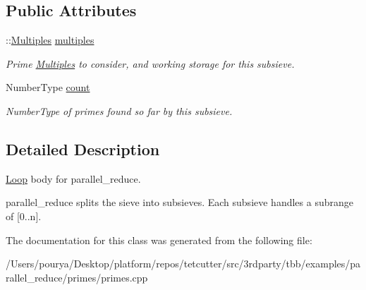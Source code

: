 \subsection*{Public Attributes}
\begin{DoxyCompactItemize}
\item 
\hypertarget{classSieve_ac311dc65ddfb10f867f5dcfc7793e9fa}{}\+::\hyperlink{classMultiples}{Multiples} \hyperlink{classSieve_ac311dc65ddfb10f867f5dcfc7793e9fa}{multiples}\label{classSieve_ac311dc65ddfb10f867f5dcfc7793e9fa}

\begin{DoxyCompactList}\small\item\em Prime \hyperlink{classMultiples}{Multiples} to consider, and working storage for this subsieve. \end{DoxyCompactList}\item 
\hypertarget{classSieve_a897ad8d6aea6a2789830df3eebca35d2}{}Number\+Type \hyperlink{classSieve_a897ad8d6aea6a2789830df3eebca35d2}{count}\label{classSieve_a897ad8d6aea6a2789830df3eebca35d2}

\begin{DoxyCompactList}\small\item\em Number\+Type of primes found so far by this subsieve. \end{DoxyCompactList}\end{DoxyCompactItemize}


\subsection{Detailed Description}
\hyperlink{classLoop}{Loop} body for parallel\+\_\+reduce. 

parallel\+\_\+reduce splits the sieve into subsieves. Each subsieve handles a subrange of \mbox{[}0..n\mbox{]}. 

The documentation for this class was generated from the following file\+:\begin{DoxyCompactItemize}
\item 
/\+Users/pourya/\+Desktop/platform/repos/tetcutter/src/3rdparty/tbb/examples/parallel\+\_\+reduce/primes/primes.\+cpp\end{DoxyCompactItemize}
